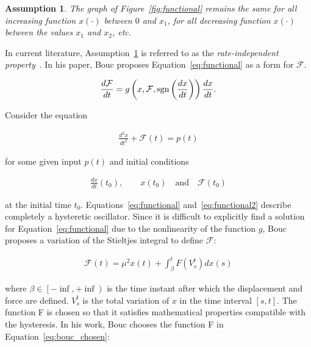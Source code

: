 \newtheorem{assumption1}{Assumption}[chapter]

\begin{assumption1} \label{ass:rip}
The graph of Figure~\ref{fig:functional} remains the same for all
increasing function $x(\cdot)$ between $0$ and $x_1$, for all decreasing
function $x(\cdot)$ between the values $x_1$ and $x_2$, etc.
\end{assumption1}

In current literature, Assumption~\ref{ass:rip} is referred to as
the \emph{rate-independent property}~\cite{visintin2013differential}.
In his paper, Bouc proposes Equation~\ref{eq:functional} as a form for $\mathcal{F}$.

\begin{align} \label{eq:functional}
\frac{d\mathcal{F}}{dt} = g \left(x,\mathcal{F},\operatorname{sgn}\left(\frac{dx}{dt}\right)\right)\frac{dx}{dt}.
\end{align}

Consider the equation

\begin{align} \label{eq:functional2}
\frac{d^2x}{dt^2}+\mathcal{F}\left(t\right) = p\left(t\right)
\end{align}

for some given input $p\left(t\right)$ and initial conditions

\begin{align}
\frac{dx}{dt}\left(t_0\right),\qquad x\left(t_0\right)\quad \text{and}\quad \mathcal{F}\left(t_0\right)
\end{align}

at the initial time $t_0$. Equations~\ref{eq:functional} and~\ref{eq:functional2}
describe completely a hysteretic oscillator. Since it is difficult to explicitly
find a solution for Equation~\ref{eq:functional} due to the nonlinearity of the
function $g$, Bouc proposes a variation of the Stieltjes integral to define $\mathcal{F}$:

\begin{align}
\mathcal{F}\left(t\right) = \mu^2x\left(t\right)+\int_\beta^tF\left(V_s^t\right)dx\left(s\right)
\end{align}

where $\beta \in \left[-\inf,+\inf\right)$ is the time instant after which
the displacement and force are defined. $V_s^t$ is the total variation of $x$
in the time interval $\left[s,t\right]$. The function F is chosen so that it
satisfies mathematical properties compatible with the hysteresis. In his work,
Bouc chooses the function F in Equation~\ref{eq:bouc_chosen}:

